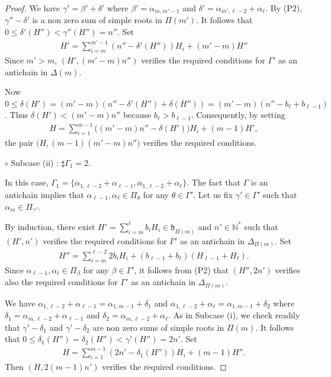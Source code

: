 \documentclass{amsart}
\theoremstyle{definition}
\theoremstyle{remark}
\numberwithin{equation}{section}
\begin{document}
\begin{proof}
We have $\gamma' = \beta' + \delta'$ where $\beta' = \alpha_{m,m'-1}$ and 
$\delta' = \alpha_{m',\ell-2}+\alpha_{\ell}$. By (P2), $\gamma'' - \delta'$ is a non zero sum 
of simple roots in $\Pi (m')$. It follows that 
$0 \leqslant \delta' ( H'') < \gamma'' (H'') = n''$. Set
$$\begin{array}{c}
H' = \sum\limits_{i=m}^{m'-1} ( n'' - \delta' (H'') ) H_{i}
+ (m'-m) H''
\end{array}$$
Since $m' > m$, $(H', (m'-m) n'')$ verifies the required conditions for $\Gamma'$ as an antichain in 
$\Delta(m)$.

Now
$
0 \leqslant \delta (H') = (m'-m) (n'' -\delta'(H'') + \delta (H'')  )
= (m'-m) (n'' - b_{\ell} + b_{\ell-1})$.
Thus $\delta (H') < (m'-m) n''$
because $b_{\ell} > b_{\ell-1}$. 
Consequently, by setting 
$$\begin{array}{c}
H = \sum\limits_{i=1}^{m-1} \bigl( (m'-m) n'' -  \delta ( H' )  \bigr) H_{i} + (m-1) H', 
\end{array}$$
the pair $\bigl( H , (m-1)(m'-m)n'' \bigr)$ verifies the required conditions.

\smallskip
\noindent $\circ$ Subcase (ii) : $\sharp \Gamma_{1} = 2$.
\smallskip

In this case, 
$\Gamma_{1} = \{ \alpha_{1,\ell-2} + \alpha_{\ell-1} , \alpha_{1,\ell-2} + \alpha_{\ell} \}$.
The fact that $\Gamma$ is an antichain implies that
$\alpha_{\ell-1}, \alpha_{\ell}\in \Pi_{\theta}$ for any $\theta \in \Gamma'$. 
Let us fix $\gamma' \in \Gamma'$ such that $\alpha_{m}\in\Pi_{\gamma'}$.

By induction, there exist $H' = \sum_{i=m}^{\ell} b_{i}H_{i} \in \mathfrak{h}_{\Pi(m)}$
and $n' \in \mathbb{N}^{*}$ such that $(H',n')$
verifies the required conditions for $\Gamma'$ as an antichain in $\Delta_{\Pi (m)}$.
Set 
$$\begin{array}{c}
H'' = \sum\limits_{i=m}^{\ell-2} 2 b_{i}H_{i}  + (b_{\ell-1} + b_{\ell} ) ( H_{\ell-1} + H_{\ell} ).
\end{array}$$
Since $\alpha_{\ell-1}, \alpha_{\ell} \in \Pi_{\beta}$  for any 
$\beta \in \Gamma'$, it follows from (P2) that $(H'' , 2n')$ verifies also the required conditions
for $\Gamma'$ as an antichain in $\Delta_{\Pi (m)}$.

We have $\alpha_{1,\ell-2} + \alpha_{\ell-1} = \alpha_{1,m-1} + \delta_{1}$ and
$\alpha_{1,\ell-2} + \alpha_{\ell}  = \alpha_{1,m-1} + \delta_{2}$ where 
$\delta_{1} = \alpha_{m,\ell-2} +\alpha_{\ell-1}$ and $\delta_{2} = \alpha_{m,\ell-2} +\alpha_{\ell}$.
As in Subcase (i), we check readily that $\gamma' - \delta_{1}$ and $\gamma'-\delta_{2}$ 
are non zero sums of simple roots in $\Pi (m)$. It follows that
$0 \leqslant \delta_{1} (H'') = \delta_{2} (H'' )  < \gamma'(H'') = 2n'$.
Set 
$$\begin{array}{c}
H = \sum\limits_{i=1}^{m-1} (2n' - \delta_{1}(H'') ) H_{i} + 
(m-1) H''.
\end{array}$$
Then $( H ,  2(m-1)n' )$ verifies the required conditions.
\smallskip


\end{proof}
\end{document}
